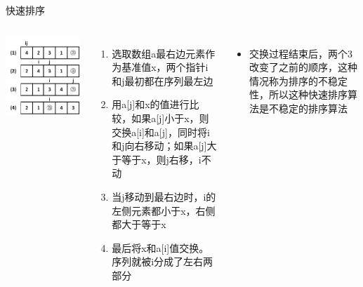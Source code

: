 \documentclass{beamer}
\begin{document}
\begin{frame}{快速排序}
    \begin{columns}
            \includegraphics[scale=0.4]{fig/2-4.png}
        \begin{enumerate}[(1)]
            \item 选取数组a最右边元素作为基准值x，两个指针i和j最初都在序列最左边
            \pause
            \item 用a[j]和x的值进行比较，如果a[j]小于x，则交换a[i]和a[j]，同时将i和j向右移动；如果a[j]大于等于x，则j右移，i不动
            \pause
            \item 当j移动到最右边时，i的左侧元素都小于x，右侧都大于等于x
            \pause
            \item 最后将x和a[i]值交换。序列就被i分成了左右两部分
            \pause
        \end{enumerate}
        \begin{itemize}
            \item 交换过程结束后，两个3改变了之前的顺序，这种情况称为排序的不稳定性，所以这种快速排序算法是不稳定的排序算法
        \end{itemize}
    \end{columns}
\end{frame}
\end{document}
